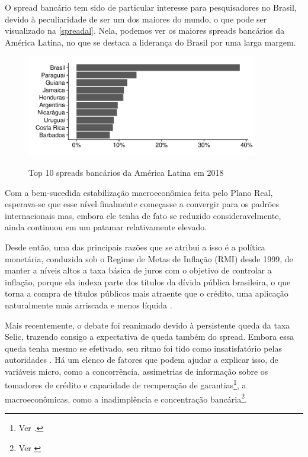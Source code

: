 \documentclass[a4paper,
               article,
               12pt,
               openany,
               oneside,
               english,
               brazil]{abntex2}
\numberwithin{equation}{section}
\begin{document}
    O spread bancário tem sido de particular interesse para pesquisadores no Brasil, devido à peculiaridade de ser um dos maiores do mundo, o que pode ser visualizado na \autoref{spreadal}. Nela, podemos ver os maiores spreads bancários da América Latina, no que se destaca a liderança do Brasil por uma larga margem.

    \begin{figure}[h]
        \centering
        \caption{Top 10 spreads bancários da América Latina em 2018}
        \includegraphics[width = 0.9\textwidth, scale=1]{spread_AL.pdf}
        \label{spreadal}
    \end{figure}

    Com a bem-sucedida estabilização macroeconômica feita pelo Plano Real, esperava-se que esse nível finalmente começasse a convergir para os padrões internacionais mas, embora ele tenha de fato se reduzido consideravelmente, ainda continuou em um patamar relativamente elevado.

    Desde então, uma das principais razões que se atribui a isso é a política monetária, conduzida sob o Regime de Metas de Inflação (RMI) desde 1999, de manter a níveis altos a taxa básica de juros com o objetivo de controlar a inflação, porque ela indexa parte dos títulos da dívida pública brasileira, o que torna a compra de títulos públicos mais atraente que o crédito, uma aplicação naturalmente mais arriscada e menos líquida \cite[p.~7]{manhica12}.
    
    Mais recentemente, o debate foi reanimado devido à persistente queda da taxa Selic, trazendo consigo a expectativa de queda também do spread. Embora essa queda tenha mesmo se efetivado, seu ritmo foi tido como insatisfatório pelas autoridades \cite{valor1}. Há um elenco de fatores que podem ajudar a explicar isso, de variáveis micro, como a concorrência, assimetrias de informação sobre os tomadores de crédito e capacidade de recuperação de garantias\footnote{Ver \cite[p.~13]{reb2018}.}, a macroeconômicas, como a inadimplência e concentração bancária\footnote{Ver \cite{valor2}}.
    
\end{document}

